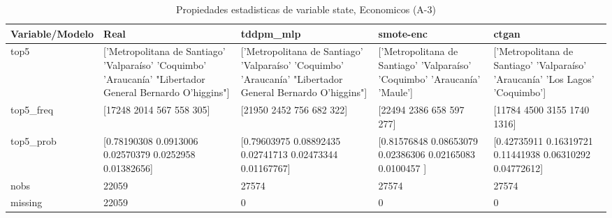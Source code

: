 \begin{table}[H]
\centering
\fontsize{8}{14}\selectfont
\caption{Propiedades  estadisticas de variable state, Economicos (A-3)}
\label{table-stats-economicos-a-3-state}
\begin{tabular}{|l|m{10em}|m{10em}|m{10em}|m{10em}|}
\hline
 \rowcolor[gray]{0.8}
Variable/Modelo & Real & tddpm\_mlp & smote-enc & ctgan \\
\hline top5 & ['Metropolitana de Santiago' 'Valparaíso' 'Coquimbo' 'Araucanía'
 "Libertador General Bernardo O'higgins"] & ['Metropolitana de Santiago' 'Valparaíso' 'Coquimbo' 'Araucanía'
 "Libertador General Bernardo O'higgins"] & ['Metropolitana de Santiago' 'Valparaíso' 'Coquimbo' 'Araucanía' 'Maule'] & ['Metropolitana de Santiago' 'Valparaíso' 'Araucanía' 'Los Lagos'
 'Coquimbo'] \\
\hline top5\_freq & [17248  2014   567   558   305] & [21950  2452   756   682   322] & [22494  2386   658   597   277] & [11784  4500  3155  1740  1316] \\
\hline top5\_prob & [0.78190308 0.0913006  0.02570379 0.0252958  0.01382656] & [0.79603975 0.08892435 0.02741713 0.02473344 0.01167767] & [0.81576848 0.08653079 0.02386306 0.02165083 0.0100457 ] & [0.42735911 0.16319721 0.11441938 0.06310292 0.04772612] \\
\hline nobs & 22059 & 27574 & 27574 & 27574 \\
\hline missing & 22059 & 0 & 0 & 0 \\
\hline
\end{tabular}
\end{table}
